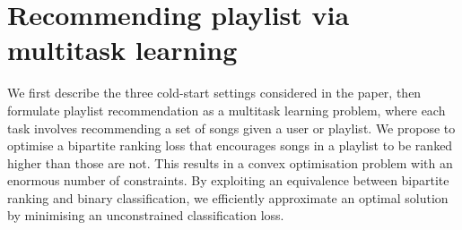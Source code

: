 \section{Recommending playlist via multitask learning}
\label{sec:method}




We first describe the three cold-start settings considered in the paper,
then formulate
playlist recommendation as a multitask learning problem, 
where each task involves recommending a set of songs given a user or playlist.
We propose to optimise a bipartite ranking loss that encourages songs in a playlist
to be ranked higher than those are not.
%
This results in a convex %
optimisation problem with an enormous number of constraints.
By exploiting an equivalence between bipartite ranking and binary classification,
we efficiently approximate an optimal solution by minimising an unconstrained classification loss.



